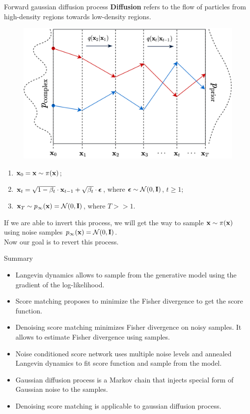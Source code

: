 \begin{frame}{Forward gaussian diffusion process}
	\textbf{Diffusion} refers to the flow of particles from high-density regions towards low-density regions.
	\vspace{-0.2cm}
	\begin{figure}
		\includegraphics[width=0.5\linewidth]{figs/diffusion_over_time}
	\end{figure}
	\vspace{-0.6cm}
	\begin{enumerate}
		\item $\mathbf{x}_0 = \mathbf{x} \sim \pi(\mathbf{x})$;
		\item $\mathbf{x}_t = \sqrt{1 - \beta_t} \cdot \mathbf{x}_{t - 1} + \sqrt{\beta_t} \cdot \boldsymbol{\epsilon}$, where $\boldsymbol{\epsilon} \sim \mathcal{N}(0, \mathbf{I})$, $t \geq 1$;
		\item $\mathbf{x}_T \sim p_{\infty}(\mathbf{x}) = \mathcal{N}(0, \mathbf{I})$, where $T >> 1$.
	\end{enumerate}
	If we are able to invert this process, we will get the way to sample $\mathbf{x} \sim \pi(\mathbf{x})$ using noise samples $p_{\infty}(\mathbf{x}) = \mathcal{N}(0, \mathbf{I})$. \\ 
	Now our goal is to revert this process.
\end{frame}
\begin{frame}{Summary}
	\begin{itemize}
		\item Langevin dynamics allows to sample from the generative model using the gradient of the log-likelihood.	
		\vfill
		\item Score matching proposes to minimize the Fisher divergence to get the score function.
		\vfill 
		\item Denoising score matching minimizes Fisher divergence on noisy samples. It allows to estimate Fisher divergence using samples.
		\vfill
		\item Noise conditioned score network uses multiple noise levels and annealed Langevin dynamics to fit score function and sample from the model.	
		\vfill
		\item Gaussian diffusion process is a Markov chain that injects special form of Gaussian noise to the samples.
		\vfill
		\item Denoising score matching is applicable to gaussian diffusion process.
	\end{itemize}
\end{frame}
 